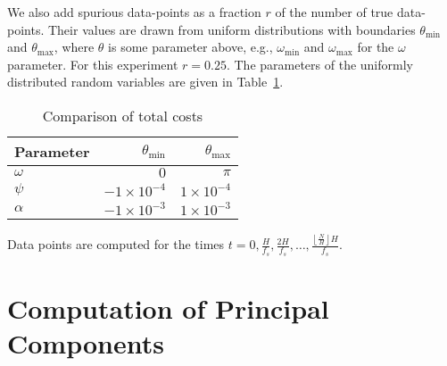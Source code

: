 We also add spurious data-points as a fraction $r$ of the number of true
data-points.  Their values are drawn from uniform distributions with boundaries
$\theta_{\text{min}}$ and $\theta_{\text{max}}$, where $\theta$ is some
parameter above, e.g., $\omega_{\text{min}}$ and $\omega_{\text{max}}$ for the
$\omega$ parameter. For this experiment $r = 0.25$. The parameters of the
uniformly distributed random variables are given in
Table~\ref{tab:amfmspuriousuniformparams}.
\begin{table}
    \caption{Comparison of total costs\label{tab:amfmspuriousuniformparams}}
    \begin{center}
        \begin{tabular}{l r r}
            Parameter & $\theta_{\text{min}}$ & $\theta_{\text{max}}$ \\
            \hline
            $\omega$  & $0$ & $\pi$ \\
            $\psi$    & $-1 \times 10^{-4}$ & $1 \times 10^{-4}$ \\
            $\alpha$    & $-1 \times 10^{-3}$ & $1 \times 10^{-3}$ \\
        \end{tabular}
    \end{center}
\end{table}
Data points are computed for the times $t = 0,\frac{H}{f_{s}},\frac{2
H}{f_{s}},\ldots,\frac{\left\lfloor \frac{N}{H} \right\rfloor H}{f_{s}}$.

\section{Computation of Principal Components}


